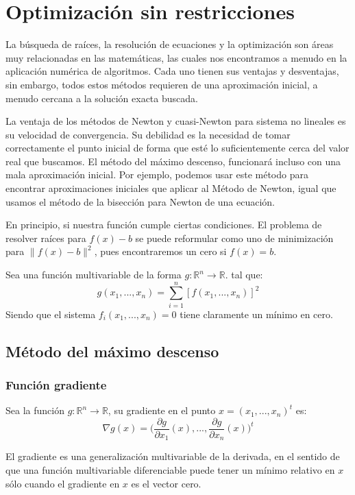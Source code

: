 \chapter{Optimización sin restricciones}

La búsqueda de raíces, la resolución de ecuaciones y la optimización son áreas muy relacionadas en las matemáticas, las cuales nos encontramos a menudo en la aplicación numérica de algoritmos. Cada uno tienen sus ventajas y desventajas, sin embargo, todos estos métodos requieren de una aproximación inicial, a menudo cercana a la solución exacta buscada.

La ventaja de los métodos de Newton y cuasi-Newton para sistema no lineales es su velocidad de convergencia. Su debilidad es la necesidad de tomar correctamente el punto inicial de forma que esté lo suficientemente cerca del valor real que buscamos.
El método del máximo descenso, funcionará incluso con una mala aproximación inicial. Por ejemplo, podemos usar este método para encontrar aproximaciones iniciales que aplicar al Método de Newton, igual que usamos el método de la bisección para Newton de una ecuación.

En principio, si nuestra función cumple ciertas condiciones. El problema de resolver raíces para $f(x) - b$ se puede reformular como uno de minimización para $\|f(x)-b\|^2$, pues encontraremos un cero si $f(x) = b$.

Sea una función multivariable de la forma $g: \mathbb{R}^n \longrightarrow \mathbb{R}$. tal que:
\[g(x_1 , ... , x_n) = \sum_{i=1}^{n} [f(x_1, ... , x_n)]^2\] 
Siendo que el sistema $f_i(x_1, ..., x_n) = 0$ tiene claramente un mínimo en cero.
\section{Método del máximo descenso}


\subsection{Función gradiente}

\begin{definition}
	Sea la función $g: \mathbb{R}^n \longrightarrow \mathbb{R}$, su gradiente en el punto $x = (x_1, ... , x_n)^t$ es:
	\[\nabla g(x) = \Big(\frac{\partial g}{\partial x_1}(x),...,\frac{\partial g}{\partial x_n}(x)\Big)^t\]
\end{definition}
El gradiente es una generalización multivariable de la derivada, en el sentido de que una función multivariable diferenciable puede tener un mínimo relativo en $x$ sólo cuando el gradiente en $x$ es el vector cero.

